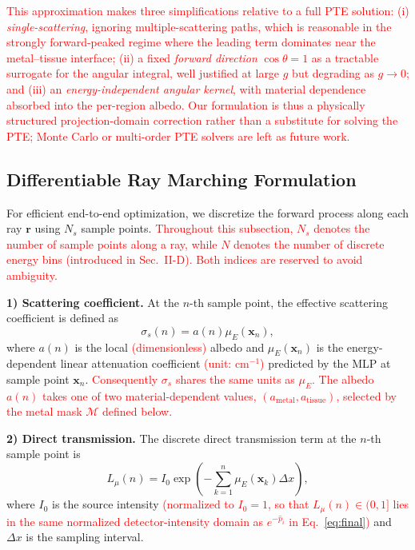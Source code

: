 \documentclass[journal]{IEEEtran}
\newcommand{\vx}{\mathbf{x}}
\newcommand{\vr}{\mathbf{r}}
\newcommand{\new}[1]{\textcolor{red}{#1}}  %
\begin{document}
\new{This approximation makes three simplifications relative to a full PTE solution: (i) \emph{single-scattering}, ignoring multiple-scattering paths, which is reasonable in the strongly forward-peaked regime where the leading term dominates near the metal--tissue interface; (ii) a fixed \emph{forward direction} $\cos\theta{=}1$ as a tractable surrogate for the angular integral, well justified at large $g$ but degrading as $g\rightarrow0$; and (iii) an \emph{energy-independent angular kernel}, with material dependence absorbed into the per-region albedo. Our formulation is thus a physically structured projection-domain correction rather than a substitute for solving the PTE; Monte Carlo or multi-order PTE solvers are left as future work.}

\subsection{Differentiable Ray Marching Formulation}
For efficient end-to-end optimization, we discretize the forward process along each ray $\vr$ using $N_s$ sample points. \new{Throughout this subsection, $N_s$ denotes the number of sample points along a ray, while $N$ denotes the number of discrete energy bins (introduced in Sec.~II-D). Both indices are reserved to avoid ambiguity.}

\textbf{1) Scattering coefficient.}
At the $n$-th sample point, the effective scattering coefficient is defined as
\begin{equation}
\sigma_s(n)=a(n)\mu_E(\vx_n),
\end{equation}
where $a(n)$ is the local \new{(dimensionless)} albedo and $\mu_E(\vx_n)$ is the energy-dependent linear attenuation coefficient \new{(unit: cm$^{-1}$)} predicted by the MLP at sample point $\vx_n$. \new{Consequently $\sigma_s$ shares the same units as $\mu_E$. The albedo $a(n)$ takes one of two material-dependent values, $(a_{\text{metal}}, a_{\text{tissue}})$, selected by the metal mask $\mathcal{M}$ defined below.}

\textbf{2) Direct transmission.}
The discrete direct transmission term at the $n$-th sample point is
\begin{equation}\label{eq:transmit}
  L_\mu(n)=I_0\exp\!\left(-\sum_{k=1}^{n}\mu_E(\vx_k)\Delta x\right),
\end{equation}
where $I_0$ is the source intensity \new{(normalized to $I_0{=}1$, so that $L_\mu(n)\in(0,1]$ lies in the same normalized detector-intensity domain as $e^{-\hat{p}_i}$ in Eq.~\eqref{eq:final})} and $\Delta x$ is the sampling interval.
\end{document}
